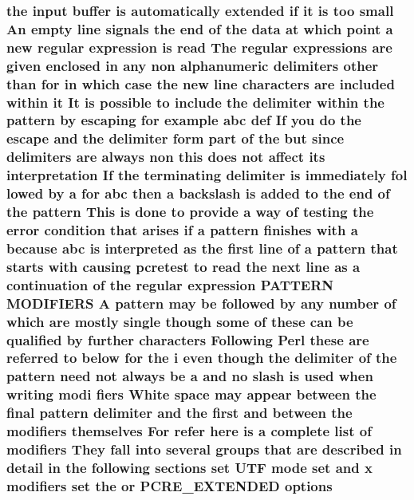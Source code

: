\subsubsection[{\texorpdfstring{options}{options}}]{\setlength{\rightskip}{0pt plus 5cm}the {\bf input} {\bf buffer} {\bf is} automatically extended {\bf if} {\bf it} {\bf is} too small An {\bf empty} {\bf line} signals the {\bf end} {\bf of} the {\bf data} at {\bf which} {\bf point} {\bf a} new regular {\bf expression} {\bf is} {\bf read} The regular {\bf expressions} {\bf are} {\bf given} enclosed {\bf in} {\bf any} non {\bf alphanumeric} delimiters other {\bf than} for {\bf in} {\bf which} {\bf case} the new {\bf line} {\bf characters} {\bf are} {\bf included} within {\bf it} It {\bf is} {\bf possible} {\bf to} {\bf include} the delimiter within the {\bf pattern} by escaping for {\bf example} {\bf abc} def If you {\bf do} the escape and the delimiter form part {\bf of} the but since delimiters {\bf are} always non {\bf this} does {\bf not} affect its interpretation If the terminating delimiter {\bf is} immediately fol lowed by {\bf a} for {\bf abc} then {\bf a} {\bf backslash} {\bf is} added {\bf to} the {\bf end} {\bf of} the {\bf pattern} This {\bf is} {\bf done} {\bf to} provide {\bf a} {\bf way} {\bf of} testing the {\bf error} condition that {\bf arises} {\bf if} {\bf a} {\bf pattern} finishes {\bf with} {\bf a} because {\bf abc} {\bf is} interpreted {\bf as} the {\bf first} {\bf line} {\bf of} {\bf a} {\bf pattern} that starts {\bf with} causing {\bf pcretest} {\bf to} {\bf read} the next {\bf line} {\bf as} {\bf a} continuation {\bf of} the regular {\bf expression} P\+A\+T\+T\+E\+RN M\+O\+D\+I\+F\+I\+E\+RS {\bf A} {\bf pattern} may {\bf be} followed by {\bf any} {\bf number} {\bf of} {\bf which} {\bf are} mostly single {\bf though} some {\bf of} these {\bf can} {\bf be} qualified by further {\bf characters} Following {\bf Perl} these {\bf are} referred {\bf to} {\bf below} for the {\bf i} even {\bf though} the delimiter {\bf of} the {\bf pattern} need {\bf not} always {\bf be} {\bf a} and no {\bf slash} {\bf is} {\bf used} when writing modi fiers White {\bf space} may appear between the final {\bf pattern} delimiter and the {\bf first} and between the {\bf modifiers} {\bf themselves} For refer {\bf here} {\bf is} {\bf a} complete {\bf list} {\bf of} {\bf modifiers} They fall into several groups that {\bf are} described {\bf in} detail {\bf in} the following sections {\bf set} U\+TF {\bf mode} {\bf set} and {\bf x} {\bf modifiers} {\bf set} the {\bf or} {\bf P\+C\+R\+E\+\_\+\+E\+X\+T\+E\+N\+D\+ED} options}\hypertarget{group__APACHE__CORE__MUTEX_gaa6c9d809037676d22aceaf5517a33faf}{}\label{group__APACHE__CORE__MUTEX_gaa6c9d809037676d22aceaf5517a33faf}
